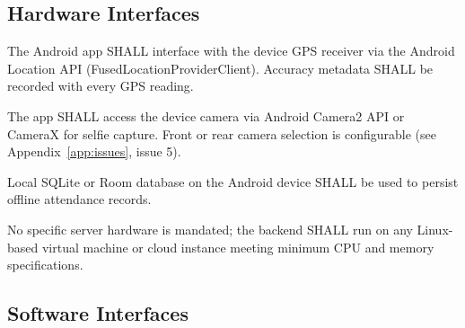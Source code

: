 \documentclass[12pt, a4paper]{article}
\begin{document}
\subsection{Hardware Interfaces}

\begin{description}[leftmargin=3cm, style=nextline]
    \item[GPS Receiver]
        The Android app SHALL interface with the device GPS receiver via
        the Android Location API (FusedLocationProviderClient). Accuracy
        metadata SHALL be recorded with every GPS reading.
    \item[Camera]
        The app SHALL access the device camera via Android Camera2 API
        or CameraX for selfie capture. Front or rear camera selection is
        configurable (see Appendix~\ref{app:issues}, issue 5).
    \item[Storage]
        Local SQLite or Room database on the Android device SHALL be used
        to persist offline attendance records.
    \item[Server Hardware]
        No specific server hardware is mandated; the backend SHALL run on
        any Linux-based virtual machine or cloud instance meeting minimum
        CPU and memory specifications.
\end{description}

\subsection{Software Interfaces}
\end{document}
